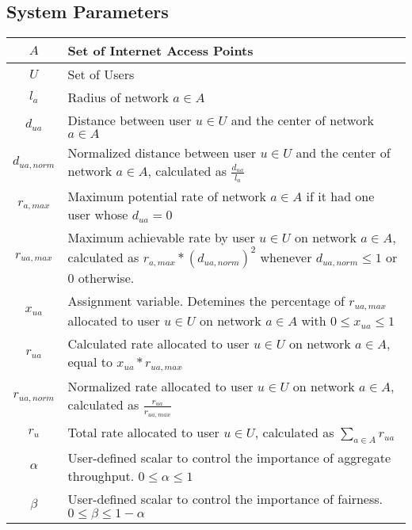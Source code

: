 \documentclass[11pt]{article}
\begin{document}
\subsection{System Parameters}
\begin{center}
\renewcommand\arraystretch{1.3}
\begin{tabular}{| c | p{12cm} |}
\hline
$A$ & Set of Internet Access Points \\ 
\hline
$U$ & Set of Users \\ 
\hline
$l_a$ & Radius of network $a \in A$ \\
\hline
$d_{ua}$ & Distance between user $u \in U$ and the center of network $a \in A$ \\ 
\hline
$d_{ua,norm}$ & Normalized distance between user $u \in U$ and the center of network $a \in A$, calculated as $\displaystyle\frac{d_{ua}}{l_a}$ \\[8pt] 
\hline
$r_{a,max}$ & Maximum potential rate of network $a \in A$ if it had one user whose $d_{ua} = 0$ \\ 
\hline
$r_{ua,max}$ & Maximum achievable rate by user $u \in U$ on network $a \in A$, calculated as $r_{a,max} * (d_{ua,norm})^2$ whenever $d_{ua,norm} \leq 1$ or 0 otherwise. \\[8pt] 
\hline
$x_{ua}$ & Assignment variable. Detemines the percentage of $r_{ua,max}$ allocated to user $u \in U$ on network $a \in A$ with $0 \leq x_{ua} \leq 1$ \\ 
\hline
$r_{ua}$ & Calculated rate allocated to user $u \in U$ on network $a \in A$, equal to $x_{ua} * r_{ua,max}$ \\ 
\hline
$r_{ua,norm}$ & Normalized rate allocated to user $u \in U$ on network $a \in A$, calculated as $\displaystyle\frac{r_{ua}}{r_{ua,max}}$ \\[8pt] 
\hline
$r_{u}$ & Total rate allocated to user $u \in U$, calculated as $\sum_{a \in A} r_{ua}$ \\ 
\hline
$\alpha$ & User-defined scalar to control the importance of aggregate throughput. $0 \leq \alpha \leq 1$ \\
\hline
$\beta$ & User-defined scalar to control the importance of fairness. $0 \leq \beta \leq 1 - \alpha$ \\
\hline
\end{tabular}
\end{center}
\pagebreak
\end{document}
